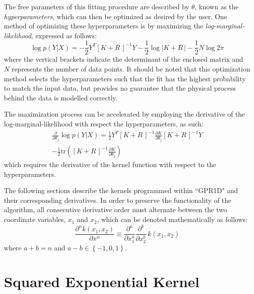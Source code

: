 \documentclass{article}
\begin{document}
The free parameters of this fitting procedure are described by $\theta$, known as the \emph{hyperparameters}, which can then be optimized as desired by the user. One method of optimizing these hyperparameters is by maximizing the \emph{log-marginal-likelihood}, expressed as follows:
\begin{equation}
\label{eq:LogMarginalLikelihood}
	\log{p\!\left(Y|X\right)} = -\frac{1}{2} Y^T \left[K + R\,\right]^{-1} Y - \frac{1}{2} \log{\left|K + R\,\right|} - \frac{1}{2} N \log{2\pi}
\end{equation}
where the vertical brackets indicate the determinant of the enclosed matrix and $N$ represents the number of data points. It should be noted that this optimization method selects the hyperparameters such that the fit has the highest probability to match the input data, but provides no guarantee that the physical process behind the data is modelled correctly.

The maximization process can be accelerated by employing the derivative of the log-marginal-likelihood with respect the hyperparameters, as such:
\begin{multline}
\label{eq:LogMarginalLikelihoodDerivative}
	\frac{\partial}{\partial \theta_j} \log{p\!\left(Y|X\right)} = \frac{1}{2} Y^T \left[K + R\,\right]^{-1} \frac{\partial K}{\partial \theta_j} \left[K + R\,\right]^{-1} Y \\
	- \frac{1}{2} \text{tr}\!\left(\left[K + R\,\right]^{-1} \frac{\partial K}{\partial \theta_j}\right)
\end{multline}
which requires the derivative of the kernel function with respect to the hyperparameters.

The following sections describe the kernels programmed within ``GPR1D" and their corresponding derivatives. In order to preserve the functionality of the algorithm, all consecutive derivative order must alternate between the two coordinate variables, $x_1$ and $x_2$, which can be denoted mathematically as follows:
\begin{equation}
\label{eq:DerivativeAlternation}
	\frac{\partial^n k\!\left(x_1,x_2\right)}{\partial x^n} \equiv \frac{\partial^a}{\partial x_1^a} \frac{\partial^b}{\partial x_2^b} \, k\!\left(x_1,x_2\right)
\end{equation}
where $a + b = n$ and $a - b \in \left\lbrace-1,0,1\right\rbrace$.

\section{Squared Exponential Kernel}
\label{sec:SEKernel}
\end{document}
